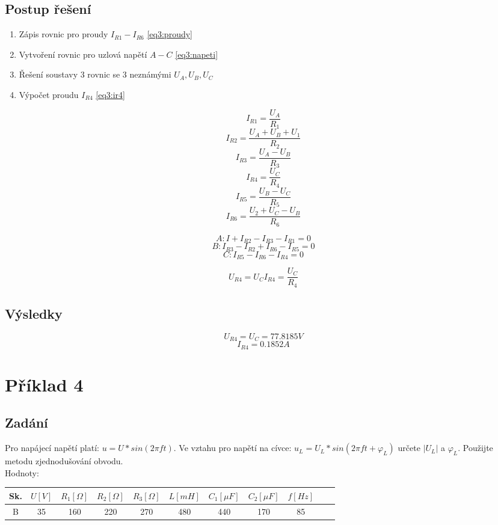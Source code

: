 \documentclass[12pt,a4paper,titlepage,final]{article}
\begin{document}
\subsection{Postup řešení}
\begin{enumerate}
\item Zápis rovnic pro proudy $I_{R1}-I_{R6}$ \ref{eq3:proudy}
\item Vytvoření rovnic pro uzlová napětí $A - C$ \ref{eq3:napeti}
\item Řešení soustavy 3 rovnic se 3 neznámými $U_A, U_B, U_C$
\item Výpočet proudu $I_{R4}$ \ref{eq3:ir4}
\end{enumerate}
\begin{equation}\label{eq3:proudy}
I_{R1} = \frac{U_A}{R_1}
\end{equation}
\[I_{R2} = \frac{U_A + U_B + U_1}{R_2}\]
\[I_{R3} = \frac{U_A-U_B}{R_3}\]
\[I_{R4} = \frac{U_C}{R_4}\]
\[I_{R5} = \frac{U_B-U_C}{R_5}\]
\[I_{R6} = \frac{U_2+U_C-U_B}{R_6}\]

\begin{equation}\label{eq3:napeti}
A: I+I_{R2}-I_{R3}-I_{R1} = 0
\end{equation}
\[B:  I_{R3}-I_{R2}+I_{R6}-I_{R5} = 0\]
\[C: I_{R5}-I_{R6}-I_{R4} = 0\]

\begin{equation}\label{eq3:ir4}
U_{R4} = U_C
I_{R4} = \frac{U_C}{R_4}
\end{equation}

\subsection{Výsledky}
\[U_{R4} = U_C = 77.8185V\]
\[I_{R4} = 0.1852A\]

\section{Příklad 4}
\subsection{Zadání}
Pro napájecí napětí platí: $u=U*sin(2\pi f t)$. Ve vztahu pro napětí na cívce: 
$u_L = U_L*sin(2\pi f t+\varphi_L)$ určete $|U_L|$ a $\varphi_L$. Použijte metodu zjednodušování obvodu.\\
Hodnoty:\\
\begin{tabular}{|c|c|c|c|c|c|c|c|c|c|c|}
\hline
Sk. & $U [V]$ & $R_1 [\Omega]$ & $R_2 [\Omega]$ & $R_3 [\Omega]$ & $L [mH]$ & $C_1 [\mu F]$  & $C_2 [\mu F]$ & $f[Hz]$\\
\hline
B & 35 & 160 & 220 & 270 & 480 & 440 & 170 & 85
\\
\hline
\end{tabular}
\end{document}
